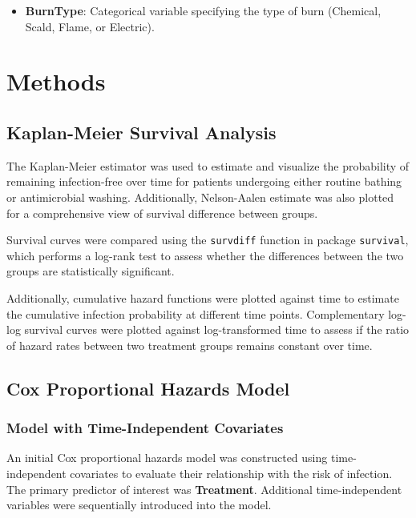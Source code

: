 \documentclass[12pt]{article}
\providecommand{\tightlist}{%
  \setlength{\itemsep}{0pt}\setlength{\parskip}{0pt}}
\begin{document}
\begin{itemize}
\tightlist
\item
  \textbf{BurnType}: Categorical variable specifying the type of burn
  (Chemical, Scald, Flame, or Electric).
\end{itemize}

\section{Methods}\label{methods}

\subsection{\texorpdfstring{\textbf{Kaplan-Meier Survival
Analysis}}{Kaplan-Meier Survival Analysis}}\label{kaplan-meier-survival-analysis}

The Kaplan-Meier estimator was used to estimate and visualize the
probability of remaining infection-free over time for patients
undergoing either routine bathing or antimicrobial washing.
Additionally, Nelson-Aalen estimate was also plotted for a comprehensive
view of survival difference between groups.

Survival curves were compared using the \texttt{survdiff} function in
package \texttt{survival}, which performs a log-rank test to assess
whether the differences between the two groups are statistically
significant.

Additionally, cumulative hazard functions were plotted against time to
estimate the cumulative infection probability at different time points.
Complementary log-log survival curves were plotted against
log-transformed time to assess if the ratio of hazard rates between two
treatment groups remains constant over time.

\subsection{\texorpdfstring{\textbf{Cox Proportional Hazards
Model}}{Cox Proportional Hazards Model}}\label{cox-proportional-hazards-model-1}

\subsubsection{\texorpdfstring{\textbf{Model with Time-Independent
Covariates}}{Model with Time-Independent Covariates}}\label{model-with-time-independent-covariates}

An initial Cox proportional hazards model was constructed using
time-independent covariates to evaluate their relationship with the risk
of infection. The primary predictor of interest was \textbf{Treatment}.
Additional time-independent variables were sequentially introduced into
the model.
\end{document}
